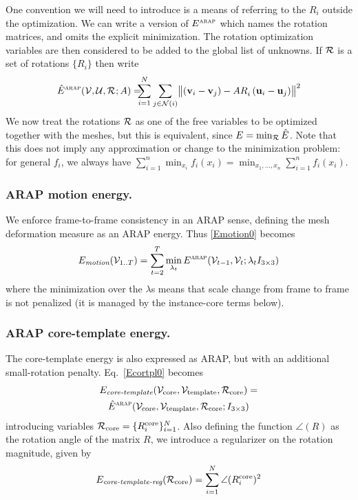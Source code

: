 \documentclass[preprint]{acmsiggraph}
\begin{document}
One convention we will need to introduce is a means of referring to the $R_i$ outside the optimization.  We can write a version of $E^\text{\sc{arap}}$ which names the rotation matrices, and omits the explicit minimization.   The rotation optimization variables are then considered to be added to the global list of unknowns. If $\mathcal{R}$ is a set of rotations $\{R_i\}$ then write 
\def\earaptag{\hat{E}^\text{\sc{arap}}}
\def\Rtag#1{R^{\text{#1}}}
\def\cRtag#1{\cR_{\text{#1}}}
\begin{equation}
\earaptag(\cV, \cU, \cRtag{}; A) =\!\!\!\!
\sum_{i=1}^N \sum_{j\in\cN(i)} 
\bigl\| \left( \bv_i - \bv_j \right) - A \Rtag{}_i\left(\bu_i - \bu_j\right)\bigr\|^2
\label{eq:earaptag}
\end{equation}
We now treat the rotations $\mathcal{R}$ as one of the free variables to be optimized together with the meshes, but this is equivalent, since $E = \min_{\mathcal{R}} \hat{E}$.
Note that this does not imply any approximation or change to the minimization problem: for general $f_i$, we always have $\sum_{i=1}^n \min_{x_i} f_i(x_i) = \min_{x_1, ..., x_n} \sum_{i=1}^n f_i(x_i)$.

\subsubsection{ARAP motion energy.}
We enforce frame-to-frame consistency in an ARAP sense, defining the mesh deformation measure as an ARAP energy.   Thus \eqref{Emotion0} becomes
\begin{equation}
E_{\text{\em motion}}(\mathcal{V}_{1..T}) = \sum_{t=2}^T \min_{\lambda_t} E^\text{\sc{arap}}(\mathcal{V}_{t-1}, \mathcal{V}_t; \lambda_t I_{3\times3}) 
\label{eq:Emotion}
\end{equation}
where the minimization over the $\lambda$s means that scale change from frame to frame is not penalized (it is managed by the instance-core terms below).

\subsubsection{ARAP core-template energy.}
The core-template energy is also expressed as ARAP, but with an additional small-rotation penalty.   Eq.~\eqref{Ecortpl0} becomes
\begin{multline}
\E{core-template}(\Vcore,\Vtemplate,\cRtag{core}) = \\
\earaptag(\Vcore, \Vtemplate, \cRtag{core}; I_{3\times3})
\label{eq:Ecortpl}
\end{multline}
introducing variables $\cRtag{core} = \{\Rtag{core}_i\}_{i=1}^N$.  Also defining the function $\angle(R)$ as the rotation angle of the matrix $R$, we introduce a regularizer on the rotation magnitude, given by
\begin{equation}
\E{core-template-reg}(\cRtag{core}) = \sum_{i=1}^N \angle(\Rtag{core}_i)^2
\label{eq:Ecortplreg}
\end{equation}
\end{document}
